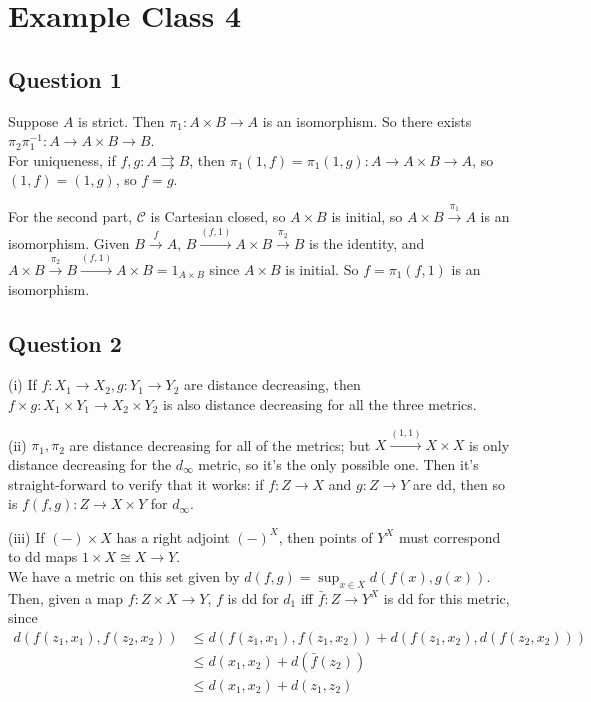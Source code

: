 \documentclass[a4paper]{article}
\begin{document}
\newpage

\section{Example Class 4}

\subsection{Question 1}
Suppose $A$ is strict. Then $\pi_1:A \times B \to A$ is an isomorphism. So there exists $\pi_2\pi_1^{-1} : A \to A \times B \to B$.\\
For uniqueness, if $f,g : A \rightrightarrows{B}$, then $\pi_1(1,f) = \pi_1(1,g):A \to A \times B \to A$, so $(1,f) = (1,g)$, so $f=g$.

For the second part, $\mathcal{C}$ is Cartesian closed, so $A \times B$ is initial, so $A \times B \xrightarrow{\pi_1} A$ is an isomorphism. Given $B \xrightarrow{f} A$, $B \xrightarrow{(f,1)} A \times B \xrightarrow{\pi_2} B$ is the identity, and $A \times B \xrightarrow{\pi_2} B \xrightarrow{(f,1)} A \times B = 1_{A \times B}$ since $A \times B$ is initial. So $f=\pi_1(f,1)$ is an isomorphism.

\subsection{Question 2}
(i) If $f:X_1 \to X_2, g:Y_1 \to Y_2$ are distance decreasing, then $f \times g: X_1 \times Y_1 \to X_2 \times Y_2$ is also distance decreasing for all the three metrics.

(ii) $\pi_1,\pi_2$ are distance decreasing for all of the metrics; but $X \xrightarrow{(1,1)} X \times X$ is only distance decreasing for the $d_\infty$ metric, so it's the only possible one. Then it's straight-forward to verify that it works: if $f:Z \to X$ and $g:Z \to Y$ are dd, then so is $f(f,g):Z \to X \times Y$ for $d_\infty$.

(iii) If $(-) \times X$ has a right adjoint $(-)^X$, then points of $Y^X$ must correspond to dd maps $1 \times X \cong X \to Y$.\\
We have a metric on this set given by $d(f,g)=\sup_{x \in X} d(f(x),g(x))$. Then, given a map $f:Z \times X \to Y$, $f$ is dd for $d_1$ iff $\bar{f}:Z \to Y^X$ is dd for this metric, since 
\begin{equation*}
\begin{aligned}
d(f(z_1,x_1),f(z_2,x_2)) &\leq d(f(z_1,x_1),f(z_1,x_2)) + d(f(z_1,x_2),d(f(z_2,x_2)))\\
&\leq d(x_1,x_2)+d(\bar{f}(z_2))\\
&\leq d(x_1,x_2)+d(z_1,z_2)
\end{aligned}
\end{equation*}
\end{document}
